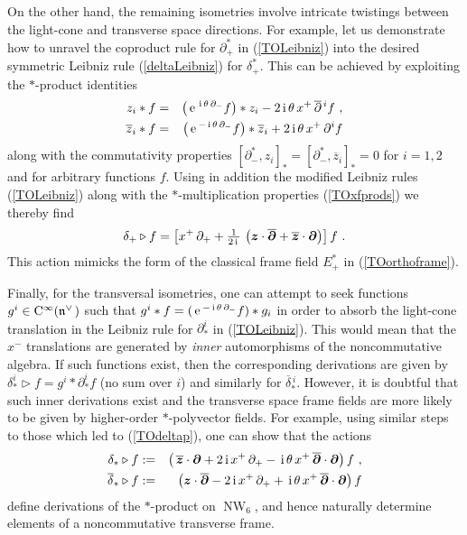 \documentclass[11pt,a4paper]{article}
\DeclareMathOperator{\NW}{NW}
\def\nn{\nonumber}
\newcommand{\1}{\mathbb{1}}
\newcommand{\mbf}[1]{{\boldsymbol {#1} }}
\def\ii{{\,{\rm i}\,}}
\def\CC{{\rm C}}
\def\mz{{\mbf z}}
\def\mdell{{\mbf\partial}}
\def\mfn{{\mathfrak n}}
\def\nn{\nonumber}
\def\e{{\,\rm e}\,}
\def\bea{\begin{eqnarray}}
\def\eea{\end{eqnarray}}
\newcommand{\beq}{\begin{eqnarray}}
\newcommand{\eeq}{\end{eqnarray}}
\begin{document}
On the other hand, the remaining isometries involve intricate
twistings between the light-cone and transverse space directions. For
example, let us demonstrate how to unravel the coproduct rule for
$\partial_+^*$ in (\ref{TOLeibniz}) into the desired symmetric Leibniz
rule (\ref{deltaLeibniz}) for $\delta_+^*$. This can be achieved by
exploiting the $*$-product identities
\bea
z_i*f&=&\bigl(\e^{\ii\theta\,\partial_-}f\bigr)*z_i-2\ii\theta\,
x^+\,\overline{\partial}{}^{\,i}f \ , \nn\\
\overline{z}_i*f&=&\bigl(\e^{-\ii\theta\,\partial_-}f\bigr)*
\overline{z}_i+2\ii\theta\,x^+\,\partial^if
\label{TOstarprodcomm}\eea
along with the commutativity properties
$[\partial_-^*,z_i]_*=[\partial_-^*,\overline{z}_i]_*=0$ for $i=1,2$
and for arbitrary functions $f$. Using in addition the modified
Leibniz rules (\ref{TOLeibniz}) along with the $*$-multiplication
properties (\ref{TOxfprods}) we thereby find
\beq
\delta_+\triangleright f=\left[x^+\,\partial_++\mbox{$\frac1{2\ii}$}\,
\left(\mz\cdot\overline{\mdell}+\overline{\mz}\cdot\mdell\right)
\right]f \ .
\label{TOdeltap}\eeq
This action mimicks the form of the classical frame field $E_+^*$ in
(\ref{TOorthoframe}).

Finally, for the transversal isometries, one can attempt to seek
functions $g^i\in\CC^\infty(\mfn^{\vee\,})$ such that
$g^i*f=(\e^{-\ii\theta\,\partial_-}f)*g_i$ in order to absorb
the light-cone translation in the Leibniz rule for $\partial_*^i$ in
(\ref{TOLeibniz}). This would mean that the $x^-$ translations are
generated by {\it inner} automorphisms of the noncommutative
algebra. If such functions exist, then the corresponding derivations
are given by $\delta^i_*\triangleright f=g^i*\partial_*^if$ (no sum over
$i$) and similarly for $\overline{\delta}{}^{\,i}_*$. However, it is
doubtful that such inner derivations exist and the transverse space
frame fields are more likely to be given by higher-order $*$-polyvector
fields. For example, using similar steps to those which led to
(\ref{TOdeltap}), one can show that the actions
\bea
\delta_*\triangleright f&:=&\left(\,\overline{\mz}\cdot\mdell+2\ii
x^+\,\partial_+-\ii\theta\,x^+\,\overline{\mdell}\cdot\mdell\right)f
\ , \nn\\
\overline{\delta}{}_*\triangleright f&:=&\left({\mz}\cdot
\overline{\mdell}-2\ii
x^+\,\partial_++\ii\theta\,x^+\,\overline{\mdell}\cdot\mdell\right)f
\label{TOdeltatransv}\eea
define derivations of the $*$-product on $\NW_6$, and hence naturally
determine elements of a noncommutative transverse frame.
\end{document}
